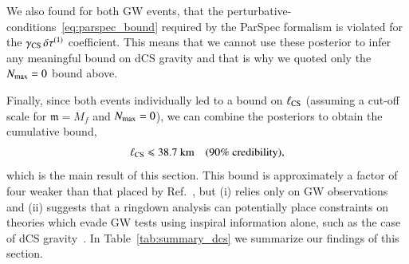 \documentclass[twocolumn,
               prd,
               aps,
               superscriptaddress,
               tightenlines,
               nofootinbib,
               eqsecnum,
               amsfonts,
               amsmath,
               longbibliography]{revtex4-1}
\newcommand{\gm}{\mathfrak{m}}
\begin{document}
We also found for both GW events, that the
perturbative-conditions~\eqref{eq:parspec_bound} required by the ParSpec
formalism is violated for the $\gamma_{\rm CS} \, \delta \tau^{(1)}$ coefficient.
%
This means that we cannot use these posterior to infer any meaningful bound on dCS gravity
and that is why we quoted only the $N_{\rm max}=0$ bound above.

Finally, since both events individually led to a bound on $\ell_{\rm CS}$
(assuming a cut-off scale for $\gm = M_{f}$ and $N_{\rm max}=0$), we can combine the
posteriors to obtain the cumulative bound,
%
\begin{equation}
\ell_{\rm CS} \leqslant 38.7~\textrm{km}
\quad \textrm{(90\% credibility)},
\end{equation}
%
which is the main result of this section.
%
This bound is approximately a factor of four weaker than that placed by
Ref.~\cite{Silva:2020acr}, but
%
(i) relies only on GW observations and
%
(ii) suggests that a ringdown analysis can potentially place constraints on
theories which evade GW tests using inspiral information alone, such as the
case of dCS gravity~\cite{Nair:2019iur,Perkins:2021mhb,Lyu:2022gdr}.
%
In Table~\ref{tab:summary_dcs} we summarize our findings of this section.
\end{document}
